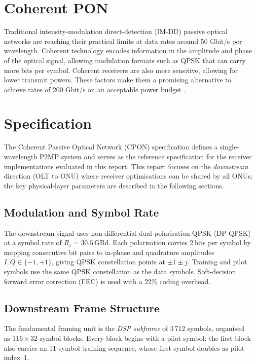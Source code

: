 \documentclass[12pt,a4paper]{report}
\begin{document}
\section{Coherent PON}
Traditional intensity-modulation direct-detection (IM-DD) passive optical networks are reaching their practical limits at data rates around 50 Gbit/s per wavelength. Coherent technology encodes information in the amplitude and phase of the optical signal, allowing modulation formats such as QPSK that can carry more bits per symbol. Coherent receivers are also more sensitive, allowing for lower transmit powers. These factors make them a promising alternative to achieve rates of 200 Gbit/s on an acceptable power budget \cite{Faruk;21}.


\section{Specification}
The Coherent Passive Optical Network (CPON) specification \cite{CPON_PMD_2025} defines a single-wavelength P2MP system and serves as the reference specification for the receiver implementations evaluated in this report. This report focuses on the \emph{downstream} direction (OLT to ONU) where receiver optimisations can be shared by all ONUs; the key physical-layer parameters are described in the following sections.

\subsection{Modulation and Symbol Rate}
The downstream signal uses non-differential dual-polarisation QPSK (DP-QPSK) at a symbol rate of $R_s = 30.5$\,GBd. Each polarisation carries 2\,bits per symbol by mapping consecutive bit pairs to in-phase and quadrature amplitudes $I,Q\in\{-1,+1\}$, giving QPSK constellation points at $\pm1\pm j$. Training and pilot symbols use the same QPSK constellation as the data symbols. Soft-decision forward error correction (FEC) is used with a 22\% coding overhead.

\subsection{Downstream Frame Structure}
\label{sec:cpon_frame}

The fundamental framing unit is the \emph{DSP subframe} of 3\,712 symbols, organised as $116\times32$-symbol blocks. Every block begins with a pilot symbol; the first block also carries an 11-symbol training sequence, whose first symbol doubles as pilot index~1.
\end{document}
